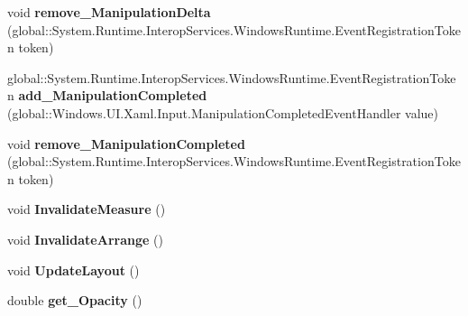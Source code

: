 \begin{DoxyCompactItemize}
\item 
\mbox{\label{interface_windows_1_1_u_i_1_1_xaml_1_1_i_u_i_element_a6abde84051b66829e30ea77484453f4f}} 
void {\bfseries remove\+\_\+\+Manipulation\+Delta} (global\+::\+System.\+Runtime.\+Interop\+Services.\+Windows\+Runtime.\+Event\+Registration\+Token token)
\item 
\mbox{\label{interface_windows_1_1_u_i_1_1_xaml_1_1_i_u_i_element_a359638bee7a6419a6b037cbd2981ae94}} 
global\+::\+System.\+Runtime.\+Interop\+Services.\+Windows\+Runtime.\+Event\+Registration\+Token {\bfseries add\+\_\+\+Manipulation\+Completed} (global\+::\+Windows.\+U\+I.\+Xaml.\+Input.\+Manipulation\+Completed\+Event\+Handler value)
\item 
\mbox{\label{interface_windows_1_1_u_i_1_1_xaml_1_1_i_u_i_element_a2e0443d9216898f5abc1ba06ac3d0404}} 
void {\bfseries remove\+\_\+\+Manipulation\+Completed} (global\+::\+System.\+Runtime.\+Interop\+Services.\+Windows\+Runtime.\+Event\+Registration\+Token token)
\item 
\mbox{\label{interface_windows_1_1_u_i_1_1_xaml_1_1_i_u_i_element_aac9b9aec43687960735502a35820466d}} 
void {\bfseries Invalidate\+Measure} ()
\item 
\mbox{\label{interface_windows_1_1_u_i_1_1_xaml_1_1_i_u_i_element_aac9b7aa8b7e9841562d377013cf574d7}} 
void {\bfseries Invalidate\+Arrange} ()
\item 
\mbox{\label{interface_windows_1_1_u_i_1_1_xaml_1_1_i_u_i_element_af7acd3e9383678b8386d4a908b7037ea}} 
void {\bfseries Update\+Layout} ()
\item 
\mbox{\label{interface_windows_1_1_u_i_1_1_xaml_1_1_i_u_i_element_ac73e763417220d829b8a2b5951828438}} 
double {\bfseries get\+\_\+\+Opacity} ()
\item 
\mbox{\label{interface_windows_1_1_u_i_1_1_xaml_1_1_i_u_i_element_a12fcaa6862ab54ca2e8c1537879d0fd8}} 

\end{DoxyCompactItemize}
